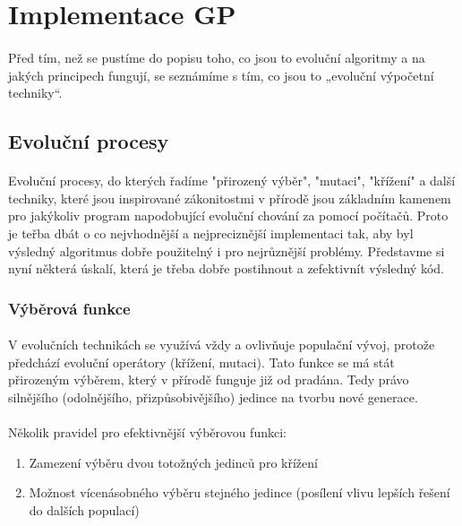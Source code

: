 \documentclass[bc,male,java,dept460]{diploma}		%
\begin{document}
\section{Implementace GP}
\paragraph*{}
Před tím, než se pustíme do popisu toho, co jsou to evoluční algoritmy a na jakých principech fungují, se seznámíme s tím, co jsou to „evoluční výpočetní techniky“.

\subsection{Evoluční procesy}
\paragraph*{}
Evoluční procesy, do kterých řadíme "přirozený výběr", "mutaci", "křížení" a další techniky, které jsou inspirované zákonitostmi v přírodě jsou základním kamenem pro jakýkoliv program napodobující evoluční chování za pomocí počítačů. Proto je teřba dbát o co nejvhodnější a nejpreciznější implementaci tak, aby byl výsledný algoritmus dobře použitelný i pro nejrůznější problémy. Představme si nyní některá úskalí, která je třeba dobře postihnout a zefektivnít výsledný kód.

\subsubsection{Výběrová funkce}
\paragraph*{}
V evolučních technikách se využívá vždy a ovlivňuje populační vývoj, protože předchází evoluční operátory (křížení, mutaci). Tato funkce se má stát přirozeným výběrem, který v přírodě funguje již od pradána. Tedy právo silnějšího (odolnějšího, přizpůsobivějšího) jedince na tvorbu nové generace.

\paragraph*{}
Několik pravidel pro efektivnější výběrovou funkci:
\begin{enumerate}
\item Zamezení výběru dvou totožných jedinců pro křížení
\item Možnost vícenásobného výběru stejného jedince (posílení vlivu lepších řešení do dalších populací)
\end{enumerate}
\end{document}
